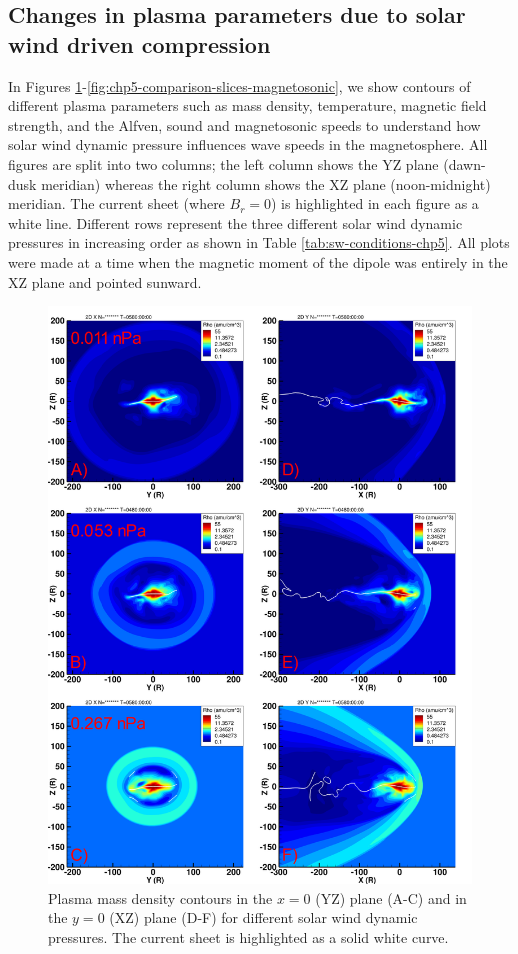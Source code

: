 \subsection{Changes in plasma parameters due to solar wind driven compression}

In Figures \ref{fig:chp5-comparison-slices-density}-\ref{fig:chp5-comparison-slices-magnetosonic}, we show contours of different plasma parameters such as mass density, temperature, magnetic field strength, and the Alfven, sound and magnetosonic speeds to understand how solar wind dynamic pressure influences wave speeds in the magnetosphere. All figures are split into two columns; the left column shows the YZ plane (dawn-dusk meridian) whereas the right column shows the XZ plane (noon-midnight) meridian. The current sheet (where $B_r=0$) is highlighted in each figure as a white line. Different rows represent the three different solar wind dynamic pressures in increasing order as shown in Table \ref{tab:sw-conditions-chp5}. All plots were made at a time when the magnetic moment of the dipole was entirely in the XZ plane and pointed sunward. 

\begin{figure}
    \centering
    \includegraphics[height=0.9\textheight]{images5/compare_runs_currentsheet_Density.png}
    \caption{Plasma mass density contours in the $x=0$ (YZ) plane (A-C) and in the $y=0$ (XZ) plane (D-F) for different solar wind dynamic pressures. The current sheet is highlighted as a solid white curve.}
    \label{fig:chp5-comparison-slices-density}
\end{figure}


